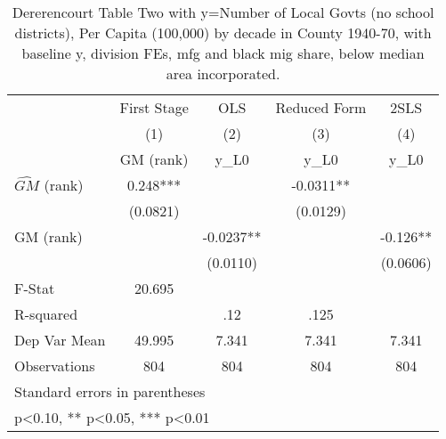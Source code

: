 \begin{table}[htbp]\centering
\def\sym#1{\ifmmode^{#1}\else\(^{#1}\)\fi}
\caption{Dererencourt Table Two with y=Number of Local Govts (no school districts), Per Capita (100,000) by decade in County 1940-70, with baseline y, division FEs, mfg and black mig share, below median area incorporated.}
\begin{tabular}{l*{4}{c}}
\toprule
                    & First Stage   &         OLS   &Reduced Form   &        2SLS   \\
                    &\multicolumn{1}{c}{(1)}&\multicolumn{1}{c}{(2)}&\multicolumn{1}{c}{(3)}&\multicolumn{1}{c}{(4)}\\
                    &\multicolumn{1}{c}{GM  (rank)}&\multicolumn{1}{c}{y\_L0}&\multicolumn{1}{c}{y\_L0}&\multicolumn{1}{c}{y\_L0}\\
\midrule
$\hat{GM}$ (rank)   &       0.248***&               &     -0.0311** &               \\
                    &    (0.0821)   &               &    (0.0129)   &               \\
\addlinespace
GM  (rank)          &               &     -0.0237** &               &      -0.126** \\
                    &               &    (0.0110)   &               &    (0.0606)   \\
\midrule
F-Stat              &      20.695   &               &               &               \\
R-squared           &               &         .12   &        .125   &               \\
Dep Var Mean        &      49.995   &       7.341   &       7.341   &       7.341   \\
Observations        &         804   &         804   &         804   &         804   \\
\bottomrule
\multicolumn{5}{l}{\footnotesize Standard errors in parentheses}\\
\multicolumn{5}{l}{\footnotesize * p<0.10, ** p<0.05, *** p<0.01}\\
\end{tabular}
\end{table}
